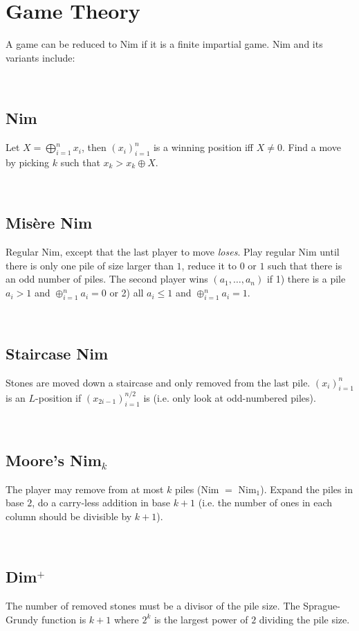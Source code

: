     \section{Game Theory}
    A game can be reduced to Nim if it is a finite impartial game.
	Nim and its variants include:

\

	\subsection{Nim}
		Let $X = \bigoplus_{i=1}^n x_i$, then $(x_i)_{i=1}^n$ is a winning position iff $X\neq 0$. Find a move by picking $k$ such that $x_k > x_k \oplus X$.

\
		
    \subsection{Mis\`{e}re Nim} 
        Regular Nim, except that the last player to move \textit{loses}. Play regular Nim until there is only one pile of size larger than $1$, reduce it to $0$ or $1$ such that there is an odd number of piles. The second player wins $(a_1, \dots, a_n)$ if 1) there is a pile $a_i > 1$ and $\oplus_{i=1}^{n} a_i = 0$ or 2) all $a_i \leq 1$ and $\oplus_{i=1}^{n} a_i = 1$.
 
\

    \subsection{Staircase Nim}
    Stones are moved down a staircase and only removed from the last pile. $(x_i)_{i=1}^n$ is an $L$-position if $(x_{2i-1})_{i=1}^{n/2}$ is (i.e. only look at odd-numbered piles).

    \


    \subsection{Moore's Nim$_k$}
    The player may remove from at most $k$ piles (Nim $=$ Nim$_1$). Expand the piles in base $2$, do a carry-less addition in base $k+1$ (i.e. the number of ones in each column should be divisible by $k+1$).
    
    \


    \subsection{Dim$^+$}
    The number of removed stones must be a divisor of the pile size. The Sprague-Grundy function is $k+1$ where $2^k$ is the largest power of $2$ dividing the pile size.
    

